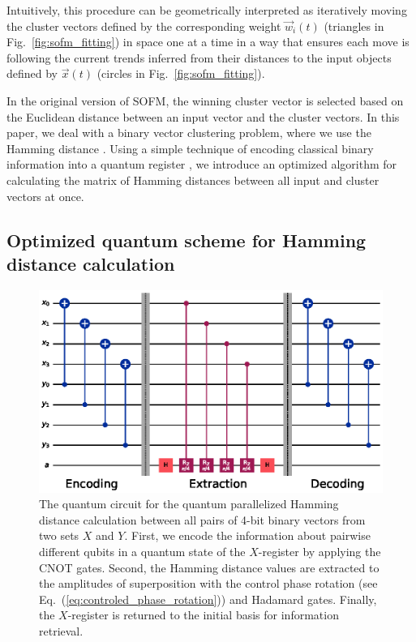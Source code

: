 \documentclass[%
  pra, aps, physrev,
  showkeys,
  twocolumn,
  showpacs,
  superscriptaddress,
  amsmath,amssymb,
  10pt
]{revtex4-2}
\begin{document}
Intuitively, this procedure can be geometrically interpreted as iteratively moving the cluster vectors defined by the corresponding weight $ \vec{w}_{i}(t) $ (triangles in Fig.~\ref{fig:sofm_fitting}) in space one at a time in a way that ensures each move is following the current trends inferred from their distances to the input objects defined by $\vec{x}(t)$ (circles in Fig.~\ref{fig:sofm_fitting}).

In the original version of SOFM, the winning cluster vector is selected based on the Euclidean distance between an input vector and the cluster vectors. In this paper, we deal with a binary vector clustering problem, where we use the Hamming distance \cite{appiah2009, santana2017}.
Using a simple technique of encoding classical binary information into a quantum register \cite{trugenberger2001},
we introduce an optimized algorithm for calculating the matrix of Hamming distances between all input and cluster vectors at once.




















\subsection{Optimized quantum scheme for Hamming distance calculation}
\label{subsec:qcircuit}


\begin{figure}[t]
  \includegraphics[width=1.85\columnwidth]{qcircuit.eps}
  \caption{%
    The quantum circuit for the quantum parallelized Hamming distance calculation between all pairs of 4-bit binary vectors from two sets ${X}$ and ${Y}$.
    First, we encode the information about pairwise different qubits in a quantum state of the $X$-register by applying the CNOT gates.
    Second, the Hamming distance values are extracted to the amplitudes of superposition with the control phase rotation (see Eq.~(\ref{eq:controled_phase_rotation})) and Hadamard gates.
    Finally, the $X$-register is returned to the initial basis for information retrieval.   }
  \label{fig:qcircuit}
\end{figure}
\end{document}
